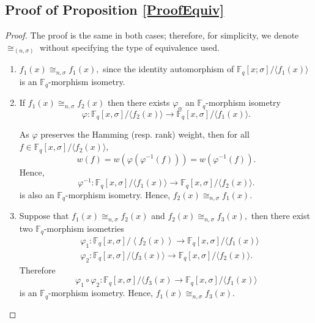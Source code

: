\documentclass[12pt,paper]{article}
\theoremstyle{plain}
\newcommand{\Fq}{\mathbb{F}_{q}}
\DeclareMathOperator{\id}{Id}
\begin{document}
\subsection{ Proof of Proposition \ref{ProofEquiv} }
\begin{proof}
The proof is the same in both cases; therefore, for simplicity, we denote $\cong_{(n,\sigma)}$
  without specifying the type of equivalence used.
\begin{enumerate}
\item  $f_1(x) \cong_{n,\sigma} f_1(x)  ,$ since 
the identity  automorphism of  $\mathbb{F}_q[x;\sigma] /\langle 
f_1(x)\rangle$  is  an $\Fq$-morphism isometry.
\item  If $ f_1(x) \cong_{n,\sigma} f_2(x) $ 
then there exists  $ \varphi_{\alpha}$ an $\Fq$-morphism isometry
 $$\varphi: \mathbb{F}_q[x,\sigma] /\langle f_2(x) \rangle \longrightarrow \mathbb{F}_q[x,\sigma] /\langle f_1(x) \rangle.$$
 
As $ \varphi$ preserves the Hamming (resp. rank) weight, then for all $f\in \mathbb{F}_q[x,\sigma] /\langle f_2(x) \rangle, $   $$ w(f)=w(\varphi(\varphi^{-1}(f)))=w(\varphi^{-1}(f)).$$
Hence, 
$$
\varphi^{-1}: \mathbb{F}_q[x,\sigma] /\langle f_1(x) \rangle \longrightarrow \mathbb{F}_q[x,\sigma] /\langle f_2(x) \rangle.
$$
is also an  $\Fq$-morphism isometry. Hence, $ f_2(x) \cong_{n,\sigma} f_1(x).$

\item Suppose that $ f_1(x) \cong_{n,\sigma} f_2(x) $  and $ f_2(x) \cong_{n,\sigma} f_3(x),$  then there exist two $\Fq$-morphism isometries
$$
\begin{aligned}
& \varphi_1: \mathbb{F}_q[x,\sigma] /\left\langle f_2(x) \right\rangle \longrightarrow \mathbb{F}_q[x,\sigma] /\langle 
f_1(x) \rangle \\
& \varphi_2: \mathbb{F}_q[x,\sigma] /\langle f_3(x)  \rangle \longrightarrow \mathbb{F}_q[x,\sigma] /\langle f_2(x)  \rangle .
\end{aligned}
$$
Therefore
$$
\varphi_{1}  \circ \varphi_{2} : \mathbb{F}_q[x,\sigma] /\langle f_3(x)  \longrightarrow 
\mathbb{F}_q[x,\sigma] /\langle f_1(x)  \rangle
$$
is an $\Fq$-morphism isometry. Hence, $ f_1(x) \cong_{n,\sigma} f_3(x). $
\end{enumerate}
 \end{proof}
 
\end{document}

